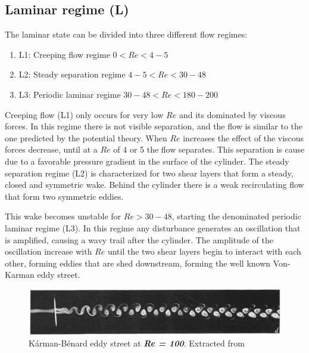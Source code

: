 \documentclass[journal]{new-aiaa}
\begin{document}
\subsection{Laminar regime (L)}

The laminar state can be divided into three different flow regimes:

\begin{enumerate}[label=(\roman*)]
\item L1: Creeping flow regime  $0<Re<4-5$
\item L2: Steady separation regime $4-5<Re<30-48$
\item L3: Periodic laminar regime $30-48<Re<180-200$
\end{enumerate}

Creeping flow (L1) only occurs for very low $Re$ and its dominated by viscous forces. In this regime there is not visible separation, and the flow is similar to the one predicted by the potential theory.  When  $Re$ increases the effect of the viscous forces decrease, until at a $Re$ of 4 or 5 the flow separates. This separation is cause due to a favorable pressure gradient in the surface of the cylinder. The steady separation regime (L2) is characterized for two shear layers that form a steady, closed and symmetric wake. Behind the cylinder there is a weak recirculating flow that form two symmetric eddies.

This wake becomes unstable for $Re > 30-48$, starting the denominated periodic laminar regime (L3). In this regime any disturbance generates an oscillation that is amplified, causing a wavy trail after the cylinder. The amplitude of the oscillation increase with $Re$ until the two shear layers begin to interact with each other, forming eddies that are shed downstream, forming the well known Von-Karman eddy street.


\begin{figure}[H]
\begin{center}
\includegraphics[width=1\textwidth]{Images/federico/Figure02}
\caption{Kárman-Bénard eddy street at \textbf{\textit{Re = 100}}. Extracted from \cite{Zdravkovich1968} }
\label{fig:Laminar}
\end{center}
\end{figure}
\end{document}
